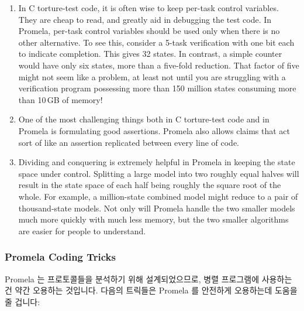 \begin{enumerate}
\item	In C torture-test code, it is often wise to keep per-task control
	variables.  They are cheap to read, and greatly aid in debugging the
	test code.  In Promela, per-task control variables should be used
	only when there is no other alternative.  To see this, consider
	a 5-task verification with one bit each to indicate completion.
	This gives 32 states.  In contrast, a simple counter would have
	only six states, more than a five-fold reduction.  That factor
	of five might not seem like a problem, at least not until you
	are struggling with a verification program possessing more than
	150 million states consuming more than 10\,GB of memory!
\item	One of the most challenging things both in C torture-test code and
	in Promela is formulating good assertions.  Promela also allows
	 claims that act sort of like an assertion replicated
	between every line of code.
\item	Dividing and conquering is extremely helpful in Promela in keeping
	the state space under control.  Splitting a large model into two
	roughly equal halves will result in the state space of each
	half being roughly the square root of the whole.
	For example, a million-state combined model might reduce to a
	pair of thousand-state models.
	Not only will Promela handle the two smaller models much more
	quickly with much less memory, but the two smaller algorithms
	are easier for people to understand.
\fi
\end{enumerate}


\subsubsection{Promela Coding Tricks}
\label{sec:formal:Promela Coding Tricks}

Promela 는 프로토콜들을 분석하기 위해 설계되었으므로, 병렬 프로그램에
사용하는건 약간 오용하는 것입니다.
다음의 트릭들은 Promela 를 안전하게 오용하는데 도움을 줄 겁니다:
\iffalse

Promela was designed to analyze protocols, so using it on parallel programs
is a bit abusive.
The following tricks can help you to abuse Promela safely:
\fi

